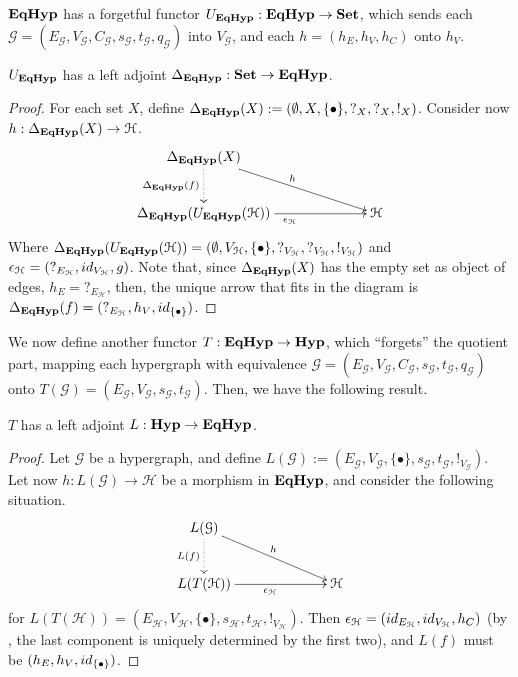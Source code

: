{$\textbf{\textup{EqHyp}}$ has a forgetful functor $U_{\textbf{\textup{EqHyp}}}:\textbf{\textup{EqHyp}} \to \mathbf{Set}$, which sends each $\mathcal{G} = (E_\mathcal{G}, V_{\mathcal{G}}, C_\mathcal{G}, s_\mathcal{G}, t_\mathcal{G}, q_\mathcal{G})$ into $V_\mathcal{G}$, and each $h = (h_E, h_V, h_C)$ onto $h_V$. 

\begin{proposition}
	$U_{\textbf{\textup{EqHyp}}}$ has a left adjoint $\Delta_{\textbf{\textup{EqHyp}}}: \mathbf{Set} \to \textbf{\textup{EqHyp}}$.
\end{proposition}

\begin{proof}
	For each set $X$, define $\Delta_{\textbf{\textup{EqHyp}}}(X):= (\emptyset, X, \{\bullet\}, ?_X, ?_X, !_X)$. Consider now $h: \Delta_{\textbf{\textup{EqHyp}}}(X) \to \mathcal{H}$.
	\[\xymatrix@C=2.3cm{
			\Delta_{\EqHyp}(X) \ar@{.>}[d]_{\Delta_\EqHyp(f)} \ar[dr]^{h} & \\
			\Delta_\EqHyp(U_{\EqHyp}(\mathcal{H})) \ar[r]_{\epsilon_{\mathcal{H}}} & \mathcal{H}
	}\]
	Where $\Delta_{\textbf{\textup{EqHyp}}}(U_{\textbf{\textup{EqHyp}}}(\mathcal{H})) = (\emptyset, V_\mathcal{H}, \{\bullet\}, ?_{V_\mathcal{H}}, ?_{V_\mathcal{H}}, !_{V_\mathcal{H}})$ and $\epsilon_{\mathcal{H}} = (?_{E_\mathcal{H}}, \id{V_\mathcal{H}}, g)$.
	Note that, since $\Delta_{\textbf{\textup{EqHyp}}}(X)$ has the empty set as object of edges, $h_E = ?_{E_\mathcal{H}}$, then, the unique arrow that fits in the diagram is $\Delta_{\EqHyp}(f) = (?_{E_\mathcal{H}}, h_V, \id{\{\bullet\}})$.

\end{proof}

We now define another functor $T: \textbf{\textup{EqHyp}} \to \textbf{\textup{Hyp}}$, which ``forgets'' the quotient part, mapping each hypergraph with equivalence $\mathcal{G} = (E_\mathcal{G}, V_{\mathcal{G}}, C_\mathcal{G}, s_\mathcal{G}, t_\mathcal{G}, q_\mathcal{G})$ onto $T(\mathcal{G})=(E_{\mathcal{G}}, V_{\mathcal{G}}, s_\mathcal{G}, t_{\mathcal{G}})$. Then, we have the following result.

\begin{proposition}
	$T$ has a left adjoint $L: \textbf{\textup{Hyp}} \to \textbf{\textup{EqHyp}}$.
\end{proposition}

\begin{proof}
	Let $\mathcal{G}$ be a hypergraph, and define $L(\mathcal{G}) := (E_\mathcal{G}, V_{\mathcal{G}}, \{\bullet\}, s_\mathcal{G}, t_\mathcal{G}, !_{V_\mathcal{G}})$. Let now $h: L(\mathcal{G})\to \mathcal{H}$ be a morphism in $\textbf{\textup{EqHyp}}$, and consider the following situation.
	\[\xymatrix@C=2.3cm{
		L(\mathcal{G}) \ar@{.>}[d]_{L(f)} \ar[dr]^{h}\\ L(T(\mathcal{H})) \ar[r]_{\epsilon_{\mathcal{H}}} & \mathcal{H}
	}\]
	for $L(T(\mathcal{H}))=(E_\mathcal{H}, V_{\mathcal{H}}, \{\bullet\}, s_\mathcal{H}, t_\mathcal{H}, !_{V_\mathcal{H}})$. Then $\epsilon_\mathcal{H} = (\id{E_\mathcal{H}}, \id{V_\mathcal{H}}, h_C)$ (by , the last component is uniquely determined by the first two), and $L(f)$ must be $(h_E, h_V, \id{\{\bullet\}})$.
\end{proof}

}
